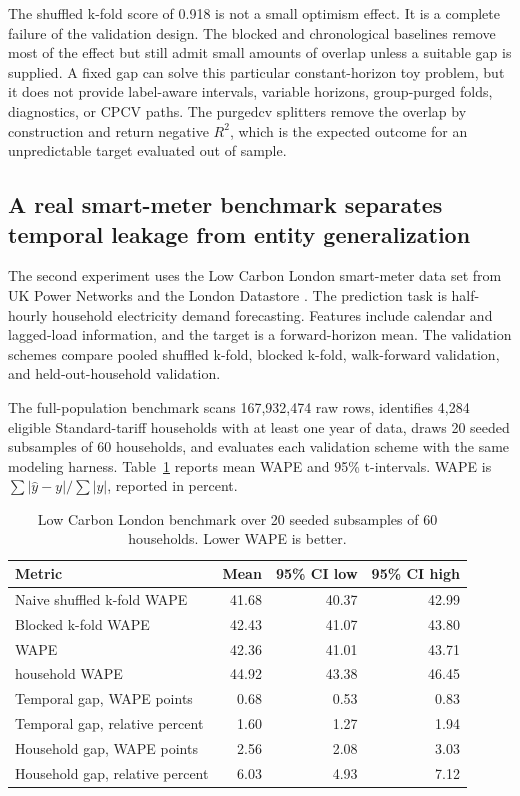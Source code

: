 \documentclass[10pt]{article}
\newcommand{\pcv}{\textsf{purgedcv}}
\DeclareRobustCommand{\code}[1]{\texttt{\detokenize{#1}}}
\begin{document}
The shuffled k-fold score of 0.918 is not a small optimism effect. It is a
complete failure of the validation design. The blocked and chronological
baselines remove most of the effect but still admit small amounts of overlap
unless a suitable gap is supplied. A fixed \code{TimeSeriesSplit} gap can solve
this particular constant-horizon toy problem, but it does not provide
label-aware intervals, variable horizons, group-purged folds, diagnostics, or
CPCV paths. The \pcv{} splitters remove the overlap by construction and return
negative $R^2$, which is the expected outcome for an unpredictable target
evaluated out of sample.

\subsection{A real smart-meter benchmark separates temporal leakage from entity generalization}

The second experiment uses the Low Carbon London smart-meter data set from UK
Power Networks and the London Datastore \citep{ukpn_lcl}. The prediction task is
half-hourly household electricity demand forecasting. Features include calendar
and lagged-load information, and the target is a forward-horizon mean. The
validation schemes compare pooled shuffled k-fold, blocked k-fold, walk-forward
validation, and held-out-household validation.

The full-population benchmark scans 167,932,474 raw rows, identifies 4,284
eligible Standard-tariff households with at least one year of data, draws 20
seeded subsamples of 60 households, and evaluates each validation scheme with
the same modeling harness. Table~\ref{tab:lcl} reports mean WAPE and 95\%
t-intervals. WAPE is $\sum |\hat{y}-y| / \sum |y|$, reported in percent.

\begin{table}[htbp]
\centering
\caption{Low Carbon London benchmark over 20 seeded subsamples of 60
households. Lower WAPE is better.}
\label{tab:lcl}
\begin{tabular}{lrrr}
\toprule
Metric & Mean & 95\% CI low & 95\% CI high \\
\midrule
Naive shuffled k-fold WAPE & 41.68 & 40.37 & 42.99 \\
Blocked k-fold WAPE & 42.43 & 41.07 & 43.80 \\
\code{WalkForwardSplit} WAPE & 42.36 & 41.01 & 43.71 \\
\code{GroupKFold} household WAPE & 44.92 & 43.38 & 46.45 \\
Temporal gap, WAPE points & 0.68 & 0.53 & 0.83 \\
Temporal gap, relative percent & 1.60 & 1.27 & 1.94 \\
Household gap, WAPE points & 2.56 & 2.08 & 3.03 \\
Household gap, relative percent & 6.03 & 4.93 & 7.12 \\
\bottomrule
\end{tabular}
\end{table}
\end{document}
